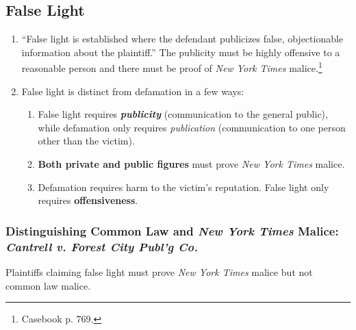 \subsection{False Light}

\begin{enumerate}
    \item ``False light is established where the defendant publicizes false, 
    objectionable information about the plaintiff.'' The publicity must be 
    highly offensive to a reasonable person and there must be proof of 
    \emph{New York Times} malice.\footnote{Casebook p. 769.}
    \item False light is distinct from defamation in a few ways:
    \begin{enumerate}
        \item False light requires \textbf{\emph{publicity}} (communication to 
        the general public), while defamation only requires \emph{publication} 
        (communication to one person other than the victim).
        \item \textbf{Both private and public figures} must prove \emph{New 
        York Times} malice.
        \item Defamation requires harm to the victim's reputation. False 
        light only requires \textbf{offensiveness}.
    \end{enumerate}
\end{enumerate}

\subsubsection{Distinguishing Common Law and \emph{New York Times} Malice: 
\emph{Cantrell v. Forest City Publ'g Co.}}

Plaintiffs claiming false light must prove \emph{New York Times} malice but 
not common law malice.

